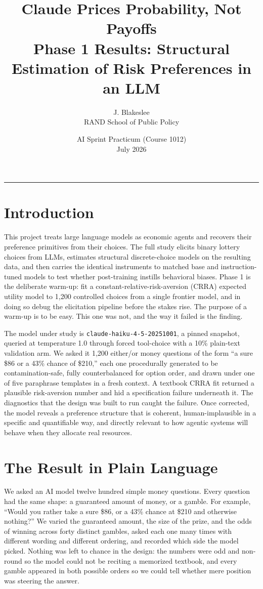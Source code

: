 \documentclass[11pt]{article}
\title{\vspace{-1.5em}\textbf{Claude Prices Probability, Not Payoffs}\\[0.3em]
\large Phase 1 Results: Structural Estimation of Risk Preferences in an LLM}
\author{J. Blakeslee \\ \small RAND School of Public Policy}
\date{\small AI Sprint Practicum (Course 1012) \\ \small July 2026}
\begin{document}
\maketitle

\hrule
\vspace{0.5em}

\section{Introduction}

This project treats large language models as economic agents and recovers their preference
primitives from their choices. The full study elicits binary lottery choices from LLMs, estimates
structural discrete-choice models on the resulting data, and then carries the identical instruments
to matched base and instruction-tuned models to test whether post-training instills behavioral
biases. Phase 1 is the deliberate warm-up: fit a constant-relative-risk-aversion (CRRA) expected
utility model to 1{,}200 controlled choices from a single frontier model, and in doing so debug the
elicitation pipeline before the stakes rise. The purpose of a warm-up is to be easy. This one was
not, and the way it failed is the finding.

The model under study is \texttt{claude-haiku-4-5-20251001}, a pinned snapshot, queried at
temperature 1.0 through forced tool-choice with a 10\% plain-text validation arm. We asked it 1{,}200
either/or money questions of the form ``a sure \$86 or a 43\% chance of \$210,'' each one
procedurally generated to be contamination-safe, fully counterbalanced for option order, and drawn
under one of five paraphrase templates in a fresh context. A textbook CRRA fit returned a plausible
risk-aversion number and hid a specification failure underneath it. The diagnostics that the design
was built to run caught the failure. Once corrected, the model reveals a preference structure that is
coherent, human-implausible in a specific and quantifiable way, and directly relevant to how agentic
systems will behave when they allocate real resources.

\section{The Result in Plain Language}

We asked an AI model twelve hundred simple money questions. Every question had the same shape: a
guaranteed amount of money, or a gamble. For example, ``Would you rather take a sure \$86, or a 43\%
chance at \$210 and otherwise nothing?'' We varied the guaranteed amount, the size of the prize, and
the odds of winning across forty distinct gambles, asked each one many times with different wording
and different ordering, and recorded which side the model picked. Nothing was left to chance in the
design: the numbers were odd and non-round so the model could not be reciting a memorized textbook,
and every gamble appeared in both possible orders so we could tell whether mere position was steering
the answer.
\end{document}
